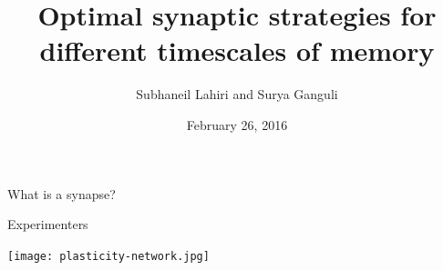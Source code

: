 \documentclass{beamer}%
\title[Timescales of memory]{Optimal synaptic strategies for different timescales of memory}
\author[Lahiri and Ganguli]{Subhaneil Lahiri and Surya Ganguli%
}
\institute[Stanford]{%
Stanford University, Applied Physics
}
\date{February 26, 2016}
\begin{document}

\begin{frame}
%
 \titlepage
%
\end{frame}

%
%
%
%
%

\begin{frame}{What is a synapse?}
%
 \begin{center}
 \parbox[c]{0.45\linewidth}{
  \begin{center}
    Experimenters
  \end{center}
 }
 \parbox[c]{0.45\linewidth}{
  \begin{center}
  \end{center}
 }

 \parbox[c]{0.45\linewidth}{
  \begin{center}
    \texttt{[image: plasticity-network.jpg]}
  \end{center}
 }
 \parbox[c]{0.45\linewidth}{
  \begin{center}
  \end{center}
 }
 \end{center}
%
\end{frame}

\end{document}
